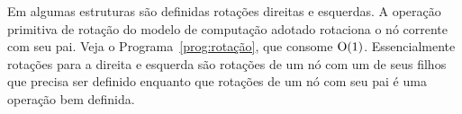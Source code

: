 \begin{comment}
\begin{programruledcaption}{Função splay.\label{prog:abb-gulosa}}
    \noindent\textbf{Entrada}: Recebe um vértice $x$ de uma ABB \\
    \textbf{Saída}: ABB com as chaves 1 a $n$ com respeito ao vetor $e$.
    \vspace{-0.5\baselineskip}
    \begin{lstlisting}[
        language={[brazilian]pseudocode},
        style=pseudocode,
        style=wider,
        functions={},
        specialidentifiers={},
        escapeinside={(*@}{@*)},
    ]
    (*@\bfseries\scshape{Função}@*) splay(x)
        y := x.pai
        se y == NULL: // x é raiz
            (*@\textbf{retorne}@*)
        se y.pai == NULL: // x é filho da raiz
            se y.esq = x:
                (*@\textbf{então}@*) rotação_direita(x) // caso zig
                (*@\textbf{senão}@*) rotação_esquerda(x) // caso zag
        se y.esq == x e y.pai.esq == y // caso zig-zig
            (*@\textbf{então}@*) rotação_direita(x)
            (*@\textbf{senão}@*) rotação_esquerda(x)
        se y.esq == x e y.pai.dir == y // caso zig-zag
            (*@\textbf{então}@*) rotação_direita(x)
            (*@\textbf{senão}@*) rotação_esquerda(x)
        se y.dir == x e y.pai.dir == y // caso zag-zag
            (*@\textbf{então}@*) rotação_direita(x)
            (*@\textbf{senão}@*) rotação_esquerda(x)
        se y.dir == x e y.pai.esq == y // caso zag-zig
            (*@\textbf{então}@*) rotação_direita(x)
            (*@\textbf{senão}@*) rotação_esquerda(x)
    devolva abb
    \end{lstlisting}
    \vspace{-0.5\baselineskip}
\end{programruledcaption}
\end{comment}

Em algumas estruturas são definidas rotações direitas e esquerdas. %
A operação primitiva de rotação do modelo de computação adotado rotaciona o nó corrente com seu pai. Veja o Programa~\ref{prog:rotação}, que consome $\mathrm{O}(1)$. Essencialmente rotações para a direita e esquerda são rotações de um nó com um de seus filhos que precisa ser definido enquanto que rotações de um nó com seu pai é uma operação bem definida.

